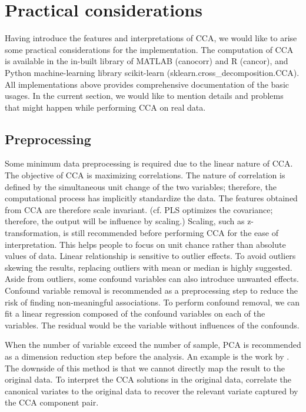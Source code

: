 

\section{Practical considerations}
\label{ch:methods:impliment}

Having introduce the features and interpretations of CCA, we would like to arise some practical considerations for the implementation. The computation of CCA is available in the in-built library of MATLAB (canocorr) and R (cancor), and Python machine-learning library scikit-learn (sklearn.cross\_decomposition.CCA). All implementations above provides comprehensive documentation of the basic usages. In the current section, we would like to mention details and problems that might happen while performing CCA on real data.

\subsection{Preprocessing}
Some minimum data preprocessing is required due to the linear nature of CCA. The objective of CCA is maximizing correlations. The nature of correlation is defined by the simultaneous unit change of the two variables; therefore, the computational process has implicitly standardize the data. The features obtained from CCA are therefore scale invariant.  (cf. PLS optimizes the covariance; therefore, the output will be influence by scaling.) Scaling, such as z-transformation, is still recommended before performing CCA for the ease of interpretation. This helps people to focus on unit chance rather than absolute values of data. Linear relationship is sensitive to outlier effects. To avoid outliers skewing the results, replacing outliers with mean or median is highly suggested. Aside from outliers, some confound variables can also introduce unwanted effects. Confound variable removal is recommended as a preprocessing step to reduce the risk of finding non-meaningful associations. To perform confound removal, we can fit a linear regression composed of the confound variables on each of the variables. The residual would be the variable without influences of the confounds.  

When the number of variable exceed the number of sample, PCA is recommended as a dimension reduction step before the analysis. An example is the work by . The downside of this method is that we cannot directly map the result to the original data. To interpret the CCA solutions in the original data,  correlate the canonical variates to the original data to recover the relevant variate captured by the CCA component pair. 

